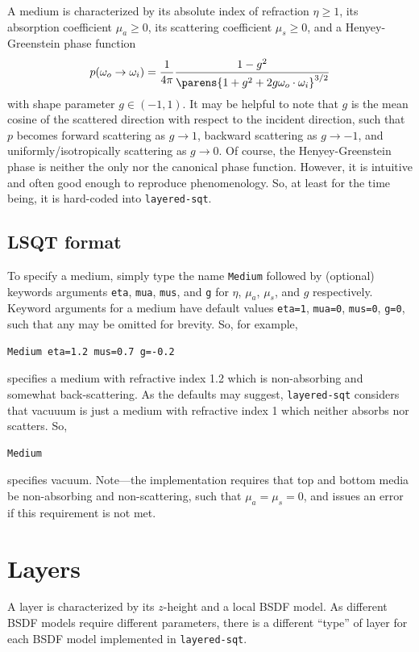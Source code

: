 \documentclass[
    twoside,
    twocolumn,
    letterpaper,
    10pt]{article}
\begin{document}
A medium is characterized by its 
absolute index of refraction $\eta \ge 1$, its absorption coefficient 
$\mu_a \ge 0 $, its scattering coefficient $\mu_s \ge 0$, and a 
Henyey-Greenstein phase function
\begin{equation*}
    p(\omega_o\to\omega_i) = 
    \frac{1}{4\pi}
    \frac{1-g^2}{\parens{1+g^2+2g\omega_o\cdot\omega_i}^{3/2}}
\end{equation*}
with shape parameter $g\in(-1,1)$. It may be helpful to note 
that $g$ is the mean cosine of the scattered direction with respect to the 
incident direction, such that $p$ becomes forward scattering as $g\to1$, 
backward scattering as $g\to-1$, and uniformly/isotropically scattering 
as $g\to0$. Of course, the Henyey-Greenstein phase is neither the only 
nor the canonical phase function. However, it is intuitive and often 
good enough to reproduce phenomenology. So, at least for the time being, 
it is hard-coded into \texttt{layered-sqt}.

\subsection{LSQT format}

To specify a medium, simply type the name \texttt{Medium} followed 
by (optional) keywords arguments \texttt{eta}, \texttt{mua}, 
\texttt{mus}, and \texttt{g} for $\eta$, $\mu_a$, $\mu_s$, and $g$
respectively. Keyword 
arguments for a medium have default values \texttt{eta=1}, \texttt{mua=0}, 
\texttt{mus=0}, \texttt{g=0}, such that any may be omitted for brevity.
So, for example,
\begin{verbatim}
Medium eta=1.2 mus=0.7 g=-0.2
\end{verbatim}
specifies a medium with refractive index 1.2 which is non-absorbing and 
somewhat back-scattering. As the defaults may suggest, \texttt{layered-sqt}
considers that vacuuum is just a medium with refractive index 1 which neither
absorbs nor scatters. So,
\begin{verbatim}
Medium
\end{verbatim}
specifies vacuum. Note---the implementation requires that top and 
bottom media be non-absorbing and non-scattering, such that $\mu_a=\mu_s=0$,
and issues an error if this requirement is not met.

\section{Layers}

A layer is characterized by its $z$-height and 
a local BSDF model. As different BSDF models require different 
parameters, there is a different ``type'' of layer for each 
BSDF model implemented in \texttt{layered-sqt}. 
\end{document}
